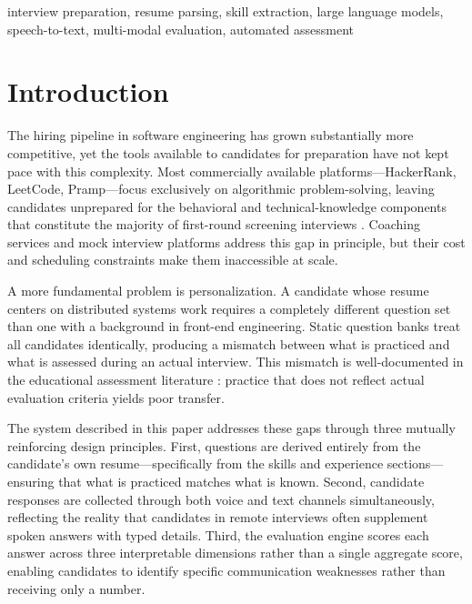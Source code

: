 \documentclass[conference]{IEEEtran}
\begin{document}
\begin{IEEEkeywords}
interview preparation, resume parsing, skill extraction, large language models, speech-to-text, multi-modal evaluation, automated assessment
\end{IEEEkeywords}

\section{Introduction}

The hiring pipeline in software engineering has grown substantially more competitive, yet the tools available to candidates for preparation have not kept pace with this complexity. Most commercially available platforms—HackerRank, LeetCode, Pramp—focus exclusively on algorithmic problem-solving, leaving candidates unprepared for the behavioral and technical-knowledge components that constitute the majority of first-round screening interviews \cite{naous2022automated}. Coaching services and mock interview platforms address this gap in principle, but their cost and scheduling constraints make them inaccessible at scale.

A more fundamental problem is personalization. A candidate whose resume centers on distributed systems work requires a completely different question set than one with a background in front-end engineering. Static question banks treat all candidates identically, producing a mismatch between what is practiced and what is assessed during an actual interview. This mismatch is well-documented in the educational assessment literature \cite{yang2021automated}: practice that does not reflect actual evaluation criteria yields poor transfer.

The system described in this paper addresses these gaps through three mutually reinforcing design principles. First, questions are derived entirely from the candidate's own resume—specifically from the skills and experience sections—ensuring that what is practiced matches what is known. Second, candidate responses are collected through both voice and text channels simultaneously, reflecting the reality that candidates in remote interviews often supplement spoken answers with typed details. Third, the evaluation engine scores each answer across three interpretable dimensions rather than a single aggregate score, enabling candidates to identify specific communication weaknesses rather than receiving only a number.
\end{document}
